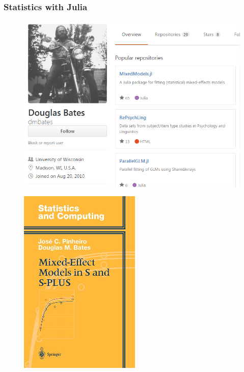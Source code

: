 \documentclass[Master.tex]{subfiles}
\begin{document}
	
\begin{frame}
	\frametitle{Statistics with Julia}
	\large
\begin{figure}
\centering
\includegraphics[width=0.99\linewidth]{images/douglasbatesgithub}

\end{figure}
\end{frame}
\begin{frame}[fragile]
	\begin{figure}
\centering
\includegraphics[width=0.50\linewidth]{images/PB-book}
\caption{}
\label{fig:PB-book}
\end{figure}
\end{frame}
\end{document}
